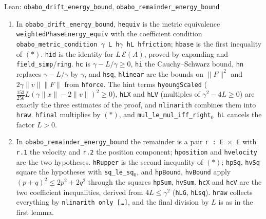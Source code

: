 \documentclass[11pt,a4paper]{article}
\begin{document}
\begin{leanbox}{Lean: \texttt{obabo\_\allowbreak{}drift\_\allowbreak{}energy\_\allowbreak{}bound}, \texttt{obabo\_\allowbreak{}remainder\_\allowbreak{}energy\_\allowbreak{}bound}}
\begin{enumerate}
\item In \texttt{obabo\_\allowbreak{}drift\_\allowbreak{}energy\_\allowbreak{}bound}, \texttt{hequiv} is the metric equivalence \texttt{weighted\allowbreak{}Phase\allowbreak{}Energy\_\allowbreak{}equiv} with the coefficient condition \texttt{obabo\_\allowbreak{}metric\_\allowbreak{}condition \ensuremath{\gamma} L h\ensuremath{\gamma} h\allowbreak{}L hfriction}; \texttt{hbase} is the first inequality of \((\ast)\). \texttt{hid} is the identity for \(L\,\mathcal E(A)\), proved by expanding and \texttt{field\_\allowbreak{}simp}/\allowbreak{}\texttt{ring}. \texttt{hc} is \(\gamma-L/\gamma\ge0\), \texttt{hi} the Cauchy–Schwarz bound, \texttt{hn} replaces \(\gamma-L/\gamma\) by \(\gamma\), and \texttt{hsq}, \texttt{hlinear} are the bounds on \(\|F\|^2\) and \(2\gamma\|v\|\|F\|\) from \texttt{hforce}. The hint terms \texttt{hyoung\allowbreak{}Scaled} (\(\frac{153}{256}L(\gamma\|x\|-2\|v\|)^2\ge0\)), \texttt{h\allowbreak{}LX} and \texttt{h\allowbreak{}LV} (multiples of \(\gamma^2-4L\ge0\)) are exactly the three estimates of the proof, and \texttt{nlinarith} combines them into \texttt{hraw}. \texttt{hfinal} multiplies by \((\ast)\), and \texttt{mul\_\allowbreak{}le\_\allowbreak{}mul\_\allowbreak{}iff\_\allowbreak{}right\ensuremath{{}_{0}} h\allowbreak{}L} cancels the factor \(L>0\).

\item In \texttt{obabo\_\allowbreak{}remainder\_\allowbreak{}energy\_\allowbreak{}bound} the remainder is a pair \texttt{r : E \ensuremath{\times} E} with \texttt{r.\allowbreak{}1} the velocity and \texttt{r.\allowbreak{}2} the position component; \texttt{hposition} and \texttt{hvelocity} are the two hypotheses. \texttt{h\allowbreak{}Rupper} is the second inequality of \((\ast)\); \texttt{hp\allowbreak{}Sq}, \texttt{hv\allowbreak{}Sq} square the hypotheses with \texttt{sq\_\allowbreak{}le\_\allowbreak{}sq\ensuremath{{}_{0}}}, and \texttt{hp\allowbreak{}Bound}, \texttt{hv\allowbreak{}Bound} apply \((p+q)^2\le2p^2+2q^2\) through the squares \texttt{hp\allowbreak{}Sum}, \texttt{hv\allowbreak{}Sum}. \texttt{hc\allowbreak{}X} and \texttt{hc\allowbreak{}V} are the two coefficient inequalities, derived from \(4L\le\gamma^2\) (\texttt{h\allowbreak{}LG}, \texttt{h\allowbreak{}Lsq}). \texttt{hraw} collects everything by \texttt{nlinarith only […]}, and the final division by \(L\) is as in the first lemma.

\end{enumerate}
\end{leanbox}
\end{document}
